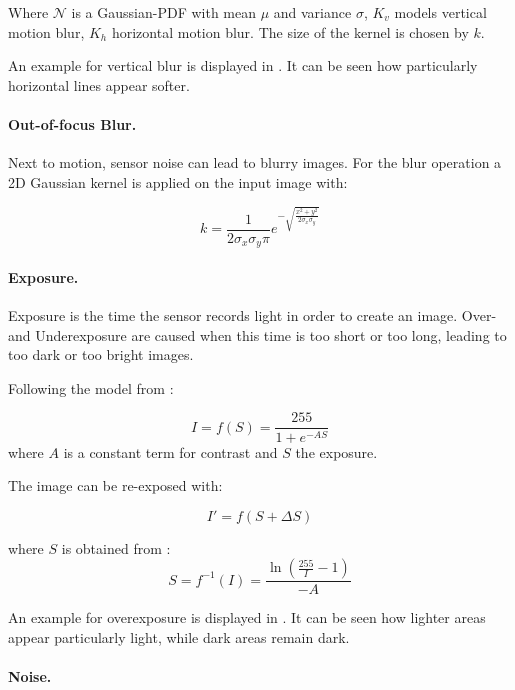 Where $\mathcal{N}$ is a Gaussian-PDF with mean $\mu$ and variance $\sigma$,  $K_v$ models vertical motion blur, $K_h$ horizontal motion blur. The size of the kernel is chosen by $k$.

An example for vertical blur is displayed in . It can be seen how particularly horizontal lines appear softer.

\paragraph{Out-of-focus Blur.}

Next to motion, sensor noise can lead to blurry images. For the blur operation a 2D Gaussian kernel is applied on the input image with:

\begin{equation}
 k = \frac{1}{2\sigma_x\sigma_y\pi}e^{-\sqrt{\frac{x^2 + y^2}{2\sigma_x\sigma_y}}} 
\end{equation}

\paragraph{Exposure.}

Exposure is the time the sensor records light in order to create an image. Over- and Underexposure are caused when this time is too short or too long, leading to too dark or too bright images.

Following the model from \cite{Carlson2018}:
 
\begin{equation}
 I = f(S) = \frac{255}{1 + e^{-A S}}
\end{equation}
where $A$ is a constant term for contrast and $S$ the exposure.

The image can be re-exposed with:

\begin{equation}
	I' = f(S+\Delta S)
\end{equation}

where $S$ is obtained from :
\begin{equation}
S = f^{-1}(I) = \frac{\ln(\frac{255}{I}-1)}{-A}
\end{equation}

An example for overexposure is displayed in . It can be seen how lighter areas appear particularly light, while dark areas remain dark.

\paragraph{Noise.}

